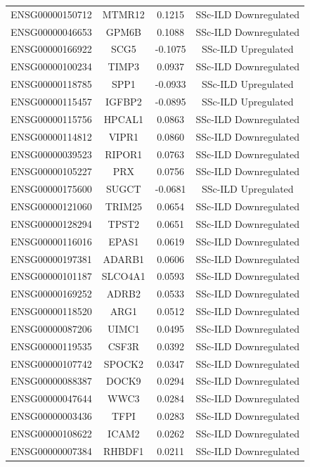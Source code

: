 \documentclass[
]{article}
\begin{document}
\begin{singlespace}
\begin{longtable}[t]{lccc}
ENSG00000150712 & MTMR12 & 0.1215 & SSc-ILD Downregulated\\
\addlinespace
ENSG00000046653 & GPM6B & 0.1088 & SSc-ILD Downregulated\\
ENSG00000166922 & SCG5 & -0.1075 & SSc-ILD Upregulated\\
ENSG00000100234 & TIMP3 & 0.0937 & SSc-ILD Downregulated\\
ENSG00000118785 & SPP1 & -0.0933 & SSc-ILD Upregulated\\
ENSG00000115457 & IGFBP2 & -0.0895 & SSc-ILD Upregulated\\
\addlinespace
ENSG00000115756 & HPCAL1 & 0.0863 & SSc-ILD Downregulated\\
ENSG00000114812 & VIPR1 & 0.0860 & SSc-ILD Downregulated\\
ENSG00000039523 & RIPOR1 & 0.0763 & SSc-ILD Downregulated\\
ENSG00000105227 & PRX & 0.0756 & SSc-ILD Downregulated\\
ENSG00000175600 & SUGCT & -0.0681 & SSc-ILD Upregulated\\
\addlinespace
ENSG00000121060 & TRIM25 & 0.0654 & SSc-ILD Downregulated\\
ENSG00000128294 & TPST2 & 0.0651 & SSc-ILD Downregulated\\
ENSG00000116016 & EPAS1 & 0.0619 & SSc-ILD Downregulated\\
ENSG00000197381 & ADARB1 & 0.0606 & SSc-ILD Downregulated\\
ENSG00000101187 & SLCO4A1 & 0.0593 & SSc-ILD Downregulated\\
\addlinespace
ENSG00000169252 & ADRB2 & 0.0533 & SSc-ILD Downregulated\\
ENSG00000118520 & ARG1 & 0.0512 & SSc-ILD Downregulated\\
ENSG00000087206 & UIMC1 & 0.0495 & SSc-ILD Downregulated\\
ENSG00000119535 & CSF3R & 0.0392 & SSc-ILD Downregulated\\
ENSG00000107742 & SPOCK2 & 0.0347 & SSc-ILD Downregulated\\
\addlinespace
ENSG00000088387 & DOCK9 & 0.0294 & SSc-ILD Downregulated\\
ENSG00000047644 & WWC3 & 0.0284 & SSc-ILD Downregulated\\
ENSG00000003436 & TFPI & 0.0283 & SSc-ILD Downregulated\\
ENSG00000108622 & ICAM2 & 0.0262 & SSc-ILD Downregulated\\
ENSG00000007384 & RHBDF1 & 0.0211 & SSc-ILD Downregulated\\

\end{longtable}
\end{singlespace}
\end{document}
